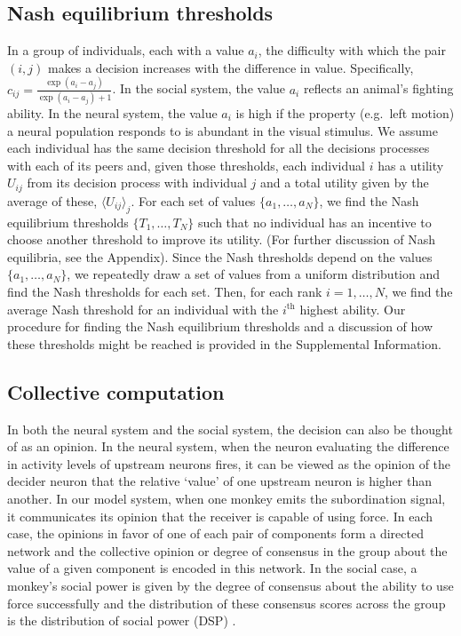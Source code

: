 \documentclass{pnastwo}
\begin{document}
\begin{article}
\subsection{Nash equilibrium thresholds}
In a group of individuals, each with a value $a_i$, the difficulty with which the pair $(i,j)$ makes a decision increases with the difference in value. Specifically, $c_{ij}=\frac{\exp(a_i-a_j)}{\exp(a_i-a_j)+1}$. In the social system, the value $a_i$ reflects an animal's fighting ability.  In the neural system, the value $a_i$ is high if the property (e.g.\ left motion) a neural population responds to is abundant in the visual stimulus. We assume each individual has the same decision threshold for all the decisions processes with each of its peers and, given those thresholds, each individual $i$ has a utility $U_{ij}$ from its decision process with individual $j$ and a total utility given by the average of these, $\langle U_{ij}\rangle _j$. For each set of values $\{a_1,\dots,a_N\}$, we find the Nash equilibrium thresholds $\{T_1,\dots,T_N\}$ such that no individual has an incentive to choose another threshold to improve its utility.  (For further discussion of Nash equilibria, see the Appendix). Since the Nash thresholds depend on the values $\{a_1,\dots,a_N\}$,  we repeatedly draw a set of values from a uniform distribution and find the Nash thresholds for each set. Then, for each rank $i=1,\dots,N$, we find the average Nash threshold for an individual with the $i^{\text{th}}$ highest ability.   Our procedure for finding the Nash equilibrium thresholds and a discussion of how these thresholds might be reached is provided in the Supplemental Information.

\subsection{Collective computation}
\label{computation}
In both the neural system and the social system, the decision can also be thought of as an opinion. In the neural system, when the neuron evaluating the difference in activity levels of upstream neurons fires, it can be viewed as the opinion of the decider neuron that the relative `value' of one upstream neuron is higher than another. In our model system, when one monkey emits the subordination signal, it communicates its opinion that the receiver is capable of using force. In each case, the opinions in favor of one of each pair of components form a directed network and the collective opinion or degree of consensus in the group about the value of a given component is encoded in this network. In the social case, a monkey's social power is given by the degree of consensus about the ability to use force successfully and the distribution of these consensus scores across the group is the distribution of social power (DSP)  \cite{Brush:2013fk, Flack:2006uq}.


\end{article}
\end{document}
